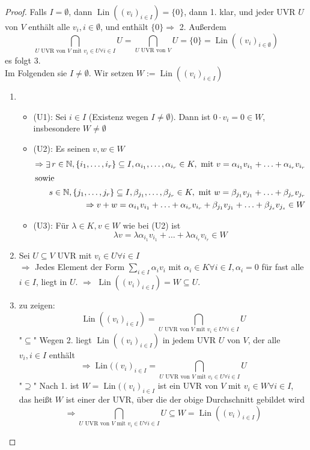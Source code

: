 \documentclass[a4paper]{scrartcl}
\DeclareMathOperator{\Exists}{\exists}
\DeclareMathOperator{\Forall}{\forall}
\DeclareMathOperator{\Lin}{Lin}
\theoremstyle{definition}
\theoremstyle{plain}
\theoremstyle{plain}
\theoremstyle{remark}
\theoremstyle{remark}
\theoremstyle{remark}
\begin{document}
\begin{proof}
Falls $I = \emptyset$, dann $\Lin((v_i)_{i\in I}) = \{0\}$, dann 1. klar, und jeder UVR $U$ von $V$ enthält alle $v_i, i\in \emptyset$, und enthält $\{0\} \Rightarrow$ 2. Außerdem
\[\bigcap_{\text{$U$ UVR von $V$ mit $v_i \in U \Forall i\in I$}} U = \bigcap_{\text{$U$ UVR von $V$}} U = \{0\} = \Lin((v_i)_{i\in\emptyset})\]
es folgt 3. \\

Im Folgenden sie $I \neq \emptyset$. Wir setzen $W:= \Lin((v_i)_{i\in I})$
\begin{enumerate}
\item \begin{itemize}
\item (U1): Sei $i \in I$ (Existenz wegen $I \neq \emptyset$). Dann ist $0\cdot v_i = 0\in W$, insbesondere $W\neq\emptyset$
\item (U2): Es seinen $v,w \in W$
\begin{align*}
\Rightarrow \Exists r\in\mathbb{N}, \{i_1, \ldots, i_r\} \subseteq I, \alpha_{i_1}, \ldots, \alpha_{i_r} \in K,~\text{mit}~v = \alpha_{i_1} v_{i_1} + \ldots + \alpha_{i_r} v_{i_r} \\
\intertext{sowie}
s\in\mathbb{N}, \{j_1, \ldots, j_r\} \subseteq I, \beta_{j_1}, \ldots, \beta_{j_r} \in K,~\text{mit}~w = \beta_{j_1} v_{j_1} + \ldots + \beta_{j_r} v_{j_r} \\
\Rightarrow v + w = \alpha_{i_1} v_{i_1} + \ldots + \alpha_{i_r} v_{i_r} + \beta_{j_1} v_{j_1} + \ldots + \beta_{j_s} v_{j_s} \in W
\end{align*}
\item (U3): Für $\lambda \in K, v\in W$ wie bei (U2) ist
\[\lambda v = \lambda \alpha_{i_1} v_{i_1} + \ldots + \lambda \alpha_{i_r} v_{i_r} \in W\]
\end{itemize}
\item Sei $U\subseteq V$ UVR mit $v_i \in U \Forall i\in I$ \\
     $\Rightarrow$ Jedes Element der Form $\displaystyle \sum_{i \in I} \alpha_i v_i$ mit $\alpha_i \in K \Forall i\in I, \alpha_i = 0$ für fast alle $i\in I$, liegt
in $U$. $\Rightarrow$ $\Lin((v_i)_{i\in I}) = W \subseteq U$.
\item zu zeigen: \[\Lin((v_i)_{i \in I}) = \bigcap_{\text{$U$ UVR von $V$ mit $v_i \in U \Forall i\in I$}} U\]
"$\subseteq$" Wegen 2. liegt $\Lin((v_i)_{i\in I})$ in jedem UVR $U$ von $V$, der alle $v_i, i\in I$ enthält
\[\Rightarrow \Lin((v_i)_{i\in I} = \bigcap_{\text{$U$ UVR von $V$ mit $v_i \in U \Forall i\in I$}} U\]
"$\supseteq$" Nach 1. ist $W = \Lin((v_i)_{i\in I}$ ist ein UVR von $V$ mit $v_i \in W \Forall i\in I$, das heißt $W$ ist einer der UVR, über die der obige Durchschnitt gebildet wird
\[\Rightarrow \bigcap_{\text{$U$ UVR von $V$ mit $v_i \in U \Forall i\in I$}} U \subseteq W = \Lin((v_i)_{i\in I})\]
\end{enumerate}
\end{proof}
\end{document}
